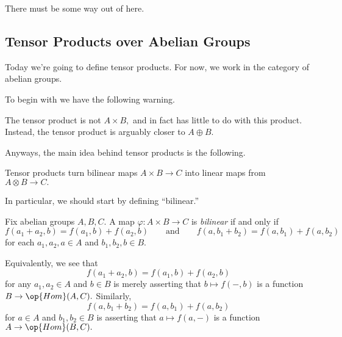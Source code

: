 















There must be some way out of here.

\subsection{Tensor Products over Abelian Groups}
Today we're going to define tensor products. For now, we work in the category of abelian groups.

To begin with we have the following warning.
\begin{warn}
	The tensor product is not $A\times B,$ and in fact has little to do with this product. Instead, the tensor product is arguably closer to $A\oplus B.$
\end{warn}
Anyways, the main idea behind tensor products is the following.
\begin{idea}
	Tensor products turn bilinear maps $A\times B\to C$ into linear maps from $A\otimes B\to C.$
\end{idea}
In particular, we should start by defining ``bilinear.''
\begin{definition}[Bilinear]
	Fix abelian groups $A,B,C.$ A map $\varphi:A\times B\to C$ is \textit{bilinear} if and only if
	\[f(a_1+a_2,b)=f(a_1,b)+f(a_2,b)\qquad\text{and}\qquad f(a,b_1+b_2)=f(a,b_1)+f(a,b_2)\]
	for each $a_1,a_2,a\in A$ and $b_1,b_2,b\in B.$
\end{definition}
Equivalently, we see that
\[f(a_1+a_2,b)=f(a_1,b)+f(a_2,b)\]
for any $a_1,a_2\in A$ and $b\in B$ is merely asserting that $b\mapsto f(-,b)$ is a function $B\to\op{Hom}(A,C).$ Similarly,
\[f(a,b_1+b_2)=f(a,b_1)+f(a,b_2)\]
for $a\in A$ and $b_1,b_2\in B$ is asserting that $a\mapsto f(a,-)$ is a function $A\to\op{Hom}(B,C).$

